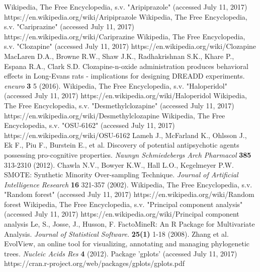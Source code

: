 \documentclass[a4paper,12pt]{article}
\begin{document}
\begin{thebibliography}{99}
Wikipedia, The Free Encyclopedia, s.v.  "Aripiprazole" (accessed July 11, 2017) https://en.wikipedia.org/wiki/Aripiprazole
Wikipedia, The Free Encyclopedia, s.v.  "Cariprazine" (accessed July 11, 2017) https://en.wikipedia.org/wiki/Cariprazine
Wikipedia, The Free Encyclopedia, s.v.  "Clozapine" (accessed July 11, 2017) https://en.wikipedia.org/wiki/Clozapine
MacLaren D.A., Browne R.W., Shaw J.K., Radhakrishnan S.K., Khare P., Espana R.A., Clark S.D. Clozapine-n-oxide administration produces behavioral effects in Long-Evans rats - implications for designing DREADD experiments. \textit{eneuro} \textbf{3} 5 (2016).
Wikipedia, The Free Encyclopedia, s.v.  "Haloperidol" (accessed July 11, 2017) https://en.wikipedia.org/wiki/Haloperidol
Wikipedia, The Free Encyclopedia, s.v.  "Desmethylclozapine" (accessed July 11, 2017) https://en.wikipedia.org/wiki/Desmethylclozapine
Wikipedia, The Free Encyclopedia, s.v.  "OSU-6162" (accessed July 11, 2017) https://en.wikipedia.org/wiki/OSU-6162
Lameh J., McFarland K., Ohlsson J., Ek F., Piu F., Burstein E., et al. Discovery of potential antipsychotic agents possessing pro-cognitive properties. \textit{Naunyn Schmiedebergs Arch Pharmacol} \textbf{385} 313-2310 (2012).
Chawla N.V., Bowyer K.W., Hall L.O., Kegelmeyer P.W. SMOTE: Synthetic Minority Over-sampling Technique. \textit{Journal of Artificial Intelligence Research} \textbf{16} 321-357 (2002).
Wikipedia, The Free Encyclopedia, s.v.  "Random forest" (accessed July 11, 2017) https://en.wikipedia.org/wiki/Random forest
Wikipedia, The Free Encyclopedia, s.v.  "Principal component analysis" (accessed July 11, 2017) https://en.wikipedia.org/wiki/Principal component analysis
Le, S., Josse, J., Husson, F. FactoMineR: An R Package for Multivariate Analysis. \textit{Journal of Statistical Software.} \textbf{25(1)} 1-18 (2008).
Zhang et al. EvolView, an online tool for visualizing, annotating and managing phylogenetic trees. \textit{Nucleic Acids Res} \textbf{4} (2012).
Package 'gplots' (accessed July 11, 2017) https://cran.r-project.org/web/packages/gplots/gplots.pdf
\end{thebibliography}
\end{document}

